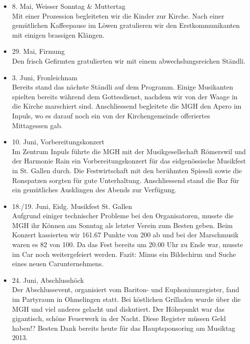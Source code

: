 \begin{history}
\begin{itemize}
        \item[]8. Mai, Weisser Sonntag & Muttertag\\
        Mit einer Prozession begleiteten wir die Kinder zur Kirche. Nach einer
        gemütlichen Kaffeepause im Löwen gratulieren wir den Erstkommunikanten
        mit einigen brassigen Klängen.

        \item[]29. Mai, Firmung\\
        Den frisch Gefirmten gratulierten wir mit einem abwechslungsreichen
        Ständli.

        \item[]3. Juni, Fronleichnam\\
        Bereits stand das nächste Ständli auf dem Programm. Einige Musikanten
        spielten bereits während dem Gottesdienst, nachdem wir von der Waage in
        die Kirche marschiert sind. Anschliessend begleitete die MGH den Apero
        im Inpuls, wo es darauf noch ein von der Kirchengemeinde offeriertes
        Mittagessen gab.

        \item[]10. Juni, Vorbereitungskonzert\\
        Im Zentrum Inpuls führte die MGH mit der Musikgesellschaft Römerswil und
        der Harmonie Rain ein Vorbereitungskonzert für das eidgenössische
        Musikfest in St. Gallen durch. Die Festwirtschaft mit den berühmten
        Spiessli sowie die Ronspatzen sorgten für gute Unterhaltung.
        Anschliessend stand die Bar für ein gemütliches Ausklingen des Abends
        zur Verfügung.

        \item[]18./19. Juni, Eidg. Musikfest St. Gallen\\
        Aufgrund einiger technischer Probleme bei den Organisatoren, musste die
        MGH ihr Können am Sonntag als letzter Verein zum Besten geben. Beim
        Konzert kassierten wir 161.67 Punkte von 200 ab und bei der Marschmusik
        waren es 82 von 100. Da das Fest bereits um 20.00 Uhr zu Ende war,
        musste im Car noch weitergefeiert werden. Fazit: Minus ein Bildschirm
        und Suche eines neuen Carunternehmens.

        \item[]24. Juni, Abschlusshöck\\
        Der Abschlussevent, organisiert vom Bariton- und Euphoniumregister, fand
        im Partyraum in Ohmelingen statt. Bei köstlichen Grilladen wurde über
        die MGH und viel anderes gelacht und diskutiert. Der Höhepunkt war das
        gigantisch, schöne Feuerwerk in der Nacht. Diese Register müssen Geld
        haben!? Besten Dank bereits heute für das Hauptsponsoring am Musiktag
        2013.


\end{itemize}
\end{history}
